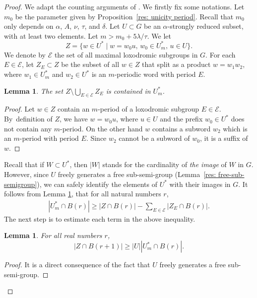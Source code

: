 \documentclass[JEP,XML,SOM,Unicode, NoEqCountersInSection,published]{cedram}
\let\mathcal\mathscr
\theoremstyle{plain}
\newtheorem{lem}[thm]{Lemma}
\theoremstyle{definition}
\begin{document}
\begin{proof}
We adapt the counting arguments of \cite{coulon_growth_2013}.
We firstly fix some notations.
Let $m_0$ be the parameter given by Proposition~\ref{res: unicity period}.
Recall that $m_0$ only depends on $\alpha$, $A$, $\nu$, $\tau$, and $\delta$.
Let $U \subset G$ be an $\alpha$-strongly reduced subset, with at least two elements.
Let $m > m_0 + 5 \lambda/\tau$.
We let
\[
Z=\{ w\in U^* \mid w= w_0u ,\, w_0\in U^*_m ,\, u\in U\}.
\]
We denote by $\mathcal{E}$ the set of all maximal loxodromic subgroups in $G$.
For each $E \in \mathcal E$, let $Z_E\subset Z$ be the subset of all $w\in Z$ that split as a product $w=w_1w_2$, where $w_1 \in U^*_m$ and $w_2\in U^*$ is an $m$-periodic word with period $E$.

\begin{lem}\label{L: growth 2}
The set $Z\setminus \bigcup_{E\in \mathcal{E}}Z_E $ is contained in $U^*_m$.
\end{lem}
\begin{proof}
Let $w\in Z$ contain an $m$-period of a loxodromic subgroup $E \in \mathcal E$.
By~definition of $Z$, we have $w=w_0u$, where $u \in U$ and the prefix $w_0\in U^*$ does not contain any $m$-period.
On the other hand $w$ contains a subword $w_2$ which is an $m$-period with period $E$.
Since $w_2$ cannot be a subword of $w_0$, it is a suffix of $w$.
\end{proof}

Recall that if $W \subset U^*$, then $|W|$ stands for the cardinality of \emph{the image} of $W$ in $G$.
However, since $U$ freely generates a free sub-semi-group (Lemma~\ref{res: free-sub-semigroup}), we can safely identify the elements of $U^*$ with their images in $G$.
It follows from Lemma \ref{L: growth 2}, that for all natural numbers $r$,\vspace*{-3pt}
\begin{align}
\label{I: growth 1}
|U^*_m\cap B(r)| \geqslant |Z\cap B(r)| - \sum_{E\in \mathcal{E}} |Z_E \cap B(r)| .
\end{align}
The next step is to estimate each term in the above inequality.

\begin{lem} \label{I: growth 2}
For all real numbers $r$,\vspace*{-3pt}
\[
|Z\cap B(r+1)| \geqslant |U| |U^*_m \cap B(r)| .
\]
\end{lem}

\begin{proof}
It is a direct consequence of the fact that $U$ freely generates a free sub-semi-group.
\end{proof}


\end{proof}
\end{document}
